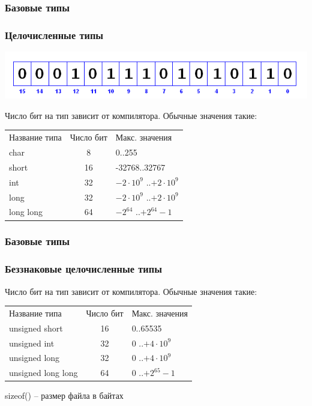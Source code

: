 \documentclass[12pt,pdf,hyperref={unicode}]{beamer}
\begin{document}
\begin{frame}
\frametitle{Базовые типы}
\frametitle{Целочисленные типы} 
\begin{center}
\includegraphics[scale=0.5]{bit_positions.png}
\end{center}
Число бит на тип зависит от компилятора. Обычные значения такие:
\begin{center}
\begin{tabular}{ l c l }
  Название типа & Число бит & Макс. значения \\
  char & 8 & 0..255 \\
  short & 16 & -32768..32767 \\
  int & 32 & $-2 \cdot 10^9$ ..$+2 \cdot 10^9$ \\
  long & 32& $-2 \cdot 10^9$ ..$+2 \cdot 10^9$ \\
  long long & 64 & $-2^{64}$ ..$+2^{64}-1$ \\
\end{tabular}
\end{center}
\end{frame}

\begin{frame}
\frametitle{Базовые типы}
\frametitle{Беззнаковые целочисленные типы} 
Число бит на тип зависит от компилятора. Обычные значения такие:
\begin{center}
\begin{tabular}{ l c l }
  Название типа & Число бит & Макс. значения \\
  unsigned short & 16 & 0..65535 \\
  unsigned int & 32 & $0$ ..$+4 \cdot 10^9$ \\
  unsigned long & 32& $0$ ..$+4 \cdot 10^9$ \\
  unsigned long long & 64 & $0$ ..$+2^{65}-1$ \\
\end{tabular}
\end{center}
sizeof() -- размер файла в байтах
\end{frame}
\end{document}
